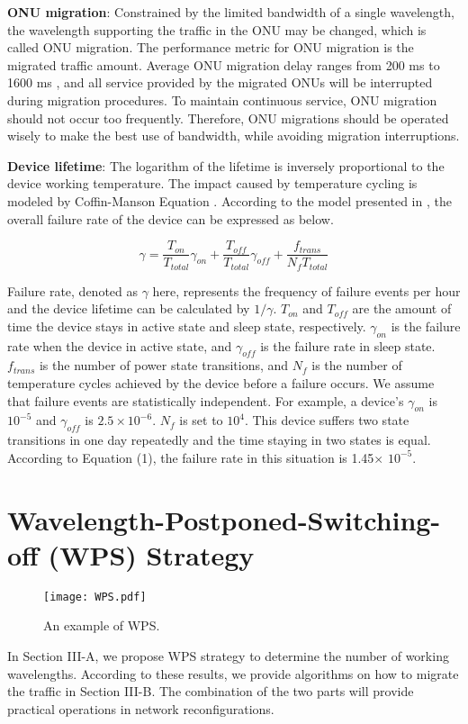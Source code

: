 \documentclass[letter]{IEEEtran}
\begin{document}
\textbf{ONU migration}: Constrained by the limited bandwidth of a single wavelength, the wavelength supporting the traffic in the ONU may be changed, which is called ONU migration. The performance metric for ONU migration is the migrated traffic amount. Average ONU migration delay ranges from 200 ms to 1600 ms \cite{Li:14}, and all service provided by the migrated ONUs will be interrupted during migration procedures. To maintain continuous service, ONU migration should not occur too frequently. Therefore, ONU migrations should be operated wisely to make the best use of bandwidth, while avoiding migration interruptions.

\textbf{Device lifetime}: The logarithm of the lifetime is inversely proportional to the device working temperature. The impact caused by temperature cycling is modeled by Coffin-Manson Equation \cite{manson1954behavior}. According to the model presented in \cite{7105670}, the overall failure rate of the device can be expressed as below.

\begin{footnotesize}
\begin{equation}
\gamma = \frac{T_{on}}{T_{total}}\gamma_{on} + \frac{T_{off}}{T_{total}}\gamma_{off} + \frac{f_{trans}}{N_{f}T_{total}}
\end{equation}
\end{footnotesize}
Failure rate, denoted as $ \gamma $ here, represents the frequency of failure events per hour and the device lifetime can be calculated by $1 /\gamma$. $T_{on}$ and $T_{off}$ are the amount of time the device stays in active state and sleep state, respectively. $\gamma_{on}$ is the failure rate when the device in active state, and $\gamma_{off}$ is the failure rate in sleep state. $f_{trans}$ is the number of power state transitions, and $N_{f}$ is the number of temperature cycles achieved by the device before a failure occurs. We assume that failure events are statistically independent. For example, a device's $\gamma_{on}$ is $ 10^{-5}$ and $\gamma_{off}$ is $ 2.5\times10^{-6}$.  $ N_{f} $ is set to $ 10^{4}$. This device suffers two state transitions in one day repeatedly and the time staying in two states is equal. According to Equation (1), the failure rate in this situation is 1.45$ \times $ $ 10^{-5}$.
\vspace{-4.0mm}

\section{Wavelength-Postponed-Switching-off (WPS) Strategy}
\begin{figure}[t]
    \centering 
        \texttt{[image: WPS.pdf]}\\ 
    \caption{ An example of WPS.}
    \label{WPS}
    \vspace{-6.0mm}
\end{figure}
In Section III-A, we propose WPS strategy to determine the number of working wavelengths. According to these results, we provide algorithms on how to migrate the traffic in Section III-B. The combination of the two parts will provide practical operations in network reconfigurations.
\vspace{-5.0mm}
\end{document}
